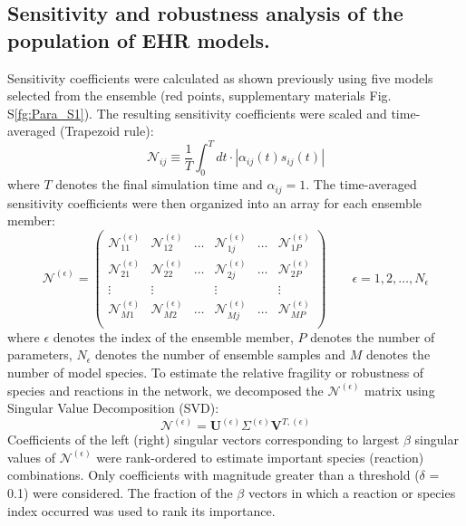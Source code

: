 \documentclass[fleqn,10pt]{wlscirep}
\begin{document}
\subsection*{Sensitivity and robustness analysis of the population of EHR models.}
Sensitivity coefficients were calculated as shown previously \cite{Song:2010ij} using five models selected from the ensemble (red points, supplementary materials Fig. S\ref{fg:Para_S1}). 
The resulting sensitivity coefficients were scaled and time-averaged (Trapezoid rule):
\begin{equation}\label{eqn_INsen}
	\mathcal{N}_{ij} \equiv \frac{1}{T}\int^{T}_{0} dt \cdot |\alpha_{ij}\left(t\right)s_{ij}(t)|
\end{equation}
where $T$ denotes the final simulation time and $\alpha_{ij}=1$.
The time-averaged sensitivity coefficients were then organized into an array for each ensemble member:
\begin{equation}
	\mathcal{N}^{\left(\epsilon\right)} = 
	\begin{pmatrix}
		\mathcal{N}_{11}^{\left(\epsilon\right)} & \mathcal{N}_{12}^{\left(\epsilon\right)} & \hdots & \mathcal{N}_{1j}^{\left(\epsilon\right)} & \hdots & \mathcal{N}_{1P}^{\left(\epsilon\right)} \\
		\mathcal{N}_{21}^{\left(\epsilon\right)} & \mathcal{N}_{22}^{\left(\epsilon\right)} & \hdots & \mathcal{N}_{2j}^{\left(\epsilon\right)} & \hdots & \mathcal{N}_{2P}^{\left(\epsilon\right)} \\
		\vdots & \vdots & & \vdots & & \vdots \\
		\mathcal{N}_{M1}^{\left(\epsilon\right)} & \mathcal{N}_{M2}^{\left(\epsilon\right)} & \hdots & \mathcal{N}_{Mj}^{\left(\epsilon\right)} & \hdots & \mathcal{N}_{MP}^{\left(\epsilon\right)} \\
	\end{pmatrix}\qquad\epsilon = 1,2,\hdots,N_{\epsilon}
\end{equation}
where $\epsilon$ denotes the index of the ensemble member, $P$ denotes the number of parameters, $N_{\epsilon}$ denotes the number of ensemble samples and $M$ denotes the number of model species.
To estimate the relative fragility or robustness of species and reactions in the network, we decomposed the $\mathcal{N}^{\left(\epsilon\right)}$ matrix 
using Singular Value Decomposition (SVD):
\begin{equation}
	\mathcal{N}^{\left(\epsilon\right)} = \mathbf{U}^{\left(\epsilon\right)}\Sigma^{\left(\epsilon\right)}\mathbf{V}^{T,{\left(\epsilon\right)}}
\end{equation}
Coefficients of the left (right) singular vectors corresponding to largest $\beta$ singular values of $\mathcal{N}^{\left(\epsilon\right)}$ 
were rank-ordered to estimate important species (reaction) combinations. Only coefficients with magnitude greater than a threshold ($\delta$ = 0.1) were considered. 
The fraction of the $\beta$ vectors in which a reaction or species index occurred was used to rank its importance. 
\end{document}
